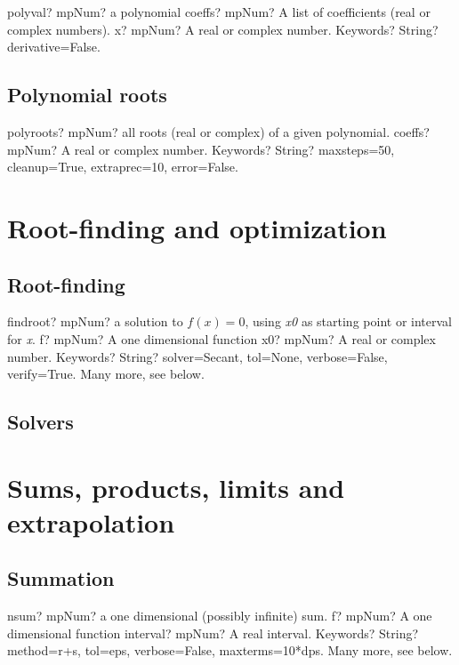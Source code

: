 \documentclass[12pt,a4paper,openany]{book}
\begin{document}
\begin{mpFunctionsExtract}
\mpFunctionThree
{polyval? mpNum? a polynomial }
{coeffs? mpNum? A list of coefficients (real or complex numbers).}
{x? mpNum? A real or complex number.}
{Keywords? String? derivative=False.}
\end{mpFunctionsExtract}

\section{Polynomial roots}

\begin{mpFunctionsExtract}
\mpFunctionTwo
{polyroots? mpNum? all roots (real or complex) of a given polynomial.}
{coeffs? mpNum? A real or complex number.}
{Keywords? String? maxsteps=50, cleanup=True, extraprec=10, error=False.}
\end{mpFunctionsExtract}

\chapter{Root-finding and optimization}

\section{Root-finding}

\begin{mpFunctionsExtract}
\mpFunctionThree
{findroot? mpNum?  a solution to $f(x)=0$, using \textit{x0} as starting point or interval for \textit{x}.}
{f? mpNum? A one dimensional function}
{x0? mpNum? A real or complex number.}
{Keywords? String? solver=Secant, tol=None, verbose=False, verify=True. Many more, see below.}
\end{mpFunctionsExtract}

\section{Solvers}

\chapter{Sums, products, limits and extrapolation}

\section{Summation}

\begin{mpFunctionsExtract}
\mpFunctionThree
{nsum? mpNum? a one dimensional (possibly infinite) sum.}
{f? mpNum? A one dimensional function}
{interval? mpNum? A real interval.}
{Keywords? String? method=r+s, tol=eps, verbose=False, maxterms=10*dps. Many more, see below.}
\end{mpFunctionsExtract}
\end{document}
